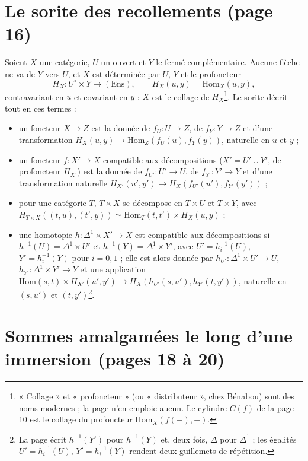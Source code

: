 \documentclass[11pt,a4paper]{article}
\begin{document}
\section*{Le sorite des recollements (page 16)}

Soient $X$ une catégorie, $U$ un ouvert et $Y$ le fermé complémentaire.
Aucune flèche ne va de $Y$ vers $U$, et $X$ est déterminée par $U$, $Y$ et le
profoncteur
\[
H_{X} : U^{\circ} \times Y \to (\mathrm{Ens}), \qquad H_{X}(u, y) =
\mathrm{Hom}_{X}(u, y),
\]
contravariant en $u$ et covariant en $y$ : $X$ est le collage de
$H_{X}$\footnote{« Collage » et « profoncteur » (ou « distributeur », chez
Bénabou) sont des noms modernes ; la page n'en emploie aucun. Le cylindre
$C(f)$ de la page 10 est le collage du profoncteur $\mathrm{Hom}_{X}(f(-),
-)$.}. Le sorite décrit tout en ces termes :
\begin{itemize}
\item[a)] un foncteur $X \to Z$ est la donnée de $f_{U} : U \to Z$, de
$f_{Y} : Y \to Z$ et d'une transformation $H_{X}(u, y) \to
\mathrm{Hom}_{Z}(f_{U}(u), f_{Y}(y))$, naturelle en $u$ et $y$ ;
\item[b)] un foncteur $f : X' \to X$ compatible aux décompositions
($X' = U' \cup Y'$, de profoncteur $H_{X'}$) est la donnée de
$f_{U'} : U' \to U$, de $f_{Y'} : Y' \to Y$ et d'une transformation naturelle
$H_{X'}(u', y') \to H_{X}(f_{U'}(u'), f_{Y'}(y'))$ ;
\item[c)] pour une catégorie $T$, $T \times X$ se décompose en
$T \times U$ et $T \times Y$, avec $H_{T \times X}((t, u), (t', y)) \simeq
\mathrm{Hom}_{T}(t, t') \times H_{X}(u, y)$ ;
\item[d)] une homotopie $h : \Delta^{1} \times X' \to X$ est compatible aux
décompositions si $h^{-1}(U) = \Delta^{1} \times U'$ et $h^{-1}(Y) =
\Delta^{1} \times Y'$, avec $U' = h_{i}^{-1}(U)$, $Y' = h_{i}^{-1}(Y)$ pour
$i = 0, 1$ ; elle est alors donnée par $h_{U'} : \Delta^{1} \times U' \to U$,
$h_{Y'} : \Delta^{1} \times Y' \to Y$ et une application
$\mathrm{Hom}(s, t) \times H_{X'}(u', y') \to H_{X}(h_{U'}(s, u'), h_{Y'}(t,
y'))$, naturelle en $(s, u')$ et $(t, y')$\footnote{La page écrit
$h^{-1}(Y')$ pour $h^{-1}(Y)$ et, deux fois, $\Delta$ pour $\Delta^{1}$ ; les
égalités $U' = h_{i}^{-1}(U)$, $Y' = h_{i}^{-1}(Y)$ rendent deux guillemets de
répétition.}.
\end{itemize}

\section*{Sommes amalgamées le long d'une immersion (pages 18 à 20)}
\end{document}
